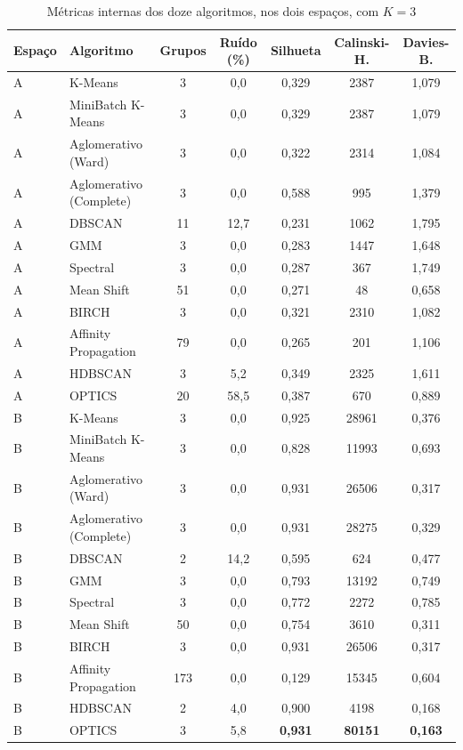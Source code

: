 \documentclass[12pt,a4paper]{article}
\begin{document}
\begin{table}[H]
\centering
\caption{Métricas internas dos doze algoritmos, nos dois espaços, com $K = 3$}
\label{tab:internas}
\begin{tabular}{llccccc}
\toprule
Espaço & Algoritmo & Grupos & Ruído (\%) & Silhueta & Calinski-H. & Davies-B. \\
\midrule
A & K-Means                 & 3  & 0{,}0  & 0{,}329 & 2387 & 1{,}079 \\
A & MiniBatch K-Means       & 3  & 0{,}0  & 0{,}329 & 2387 & 1{,}079 \\
A & Aglomerativo (Ward)     & 3  & 0{,}0  & 0{,}322 & 2314 & 1{,}084 \\
A & Aglomerativo (Complete) & 3  & 0{,}0  & 0{,}588 & 995  & 1{,}379 \\
A & DBSCAN                  & 11 & 12{,}7 & 0{,}231 & 1062 & 1{,}795 \\
A & GMM                     & 3  & 0{,}0  & 0{,}283 & 1447 & 1{,}648 \\
A & Spectral                & 3  & 0{,}0  & 0{,}287 & 367  & 1{,}749 \\
A & Mean Shift              & 51 & 0{,}0  & 0{,}271 & 48   & 0{,}658 \\
A & BIRCH                   & 3  & 0{,}0  & 0{,}321 & 2310 & 1{,}082 \\
A & Affinity Propagation    & 79 & 0{,}0  & 0{,}265 & 201  & 1{,}106 \\
A & HDBSCAN                 & 3  & 5{,}2  & 0{,}349 & 2325 & 1{,}611 \\
A & OPTICS                  & 20 & 58{,}5 & 0{,}387 & 670  & 0{,}889 \\
\midrule
B & K-Means                 & 3   & 0{,}0  & 0{,}925 & 28961 & 0{,}376 \\
B & MiniBatch K-Means       & 3   & 0{,}0  & 0{,}828 & 11993 & 0{,}693 \\
B & Aglomerativo (Ward)     & 3   & 0{,}0  & 0{,}931 & 26506 & 0{,}317 \\
B & Aglomerativo (Complete) & 3   & 0{,}0  & 0{,}931 & 28275 & 0{,}329 \\
B & DBSCAN                  & 2   & 14{,}2 & 0{,}595 & 624   & 0{,}477 \\
B & GMM                     & 3   & 0{,}0  & 0{,}793 & 13192 & 0{,}749 \\
B & Spectral                & 3   & 0{,}0  & 0{,}772 & 2272  & 0{,}785 \\
B & Mean Shift              & 50  & 0{,}0  & 0{,}754 & 3610  & 0{,}311 \\
B & BIRCH                   & 3   & 0{,}0  & 0{,}931 & 26506 & 0{,}317 \\
B & Affinity Propagation    & 173 & 0{,}0  & 0{,}129 & 15345 & 0{,}604 \\
B & HDBSCAN                 & 2   & 4{,}0  & 0{,}900 & 4198  & 0{,}168 \\
B & OPTICS                  & 3   & 5{,}8  & \textbf{0{,}931} & \textbf{80151} & \textbf{0{,}163} \\
\bottomrule
\end{tabular}
\end{table}
\end{document}
